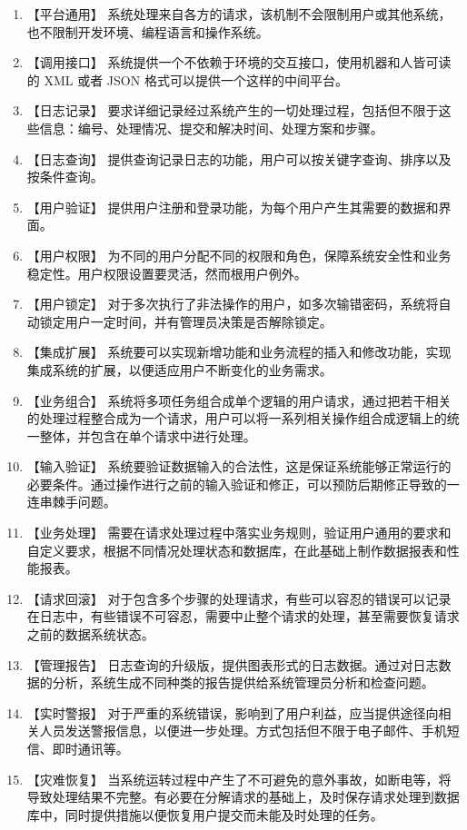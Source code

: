 \documentclass[cs4size,a4paper,nofonts]{ctexart}
\begin{document}
\begin{enumerate}
\item 【平台通用】
系统处理来自各方的请求，该机制不会限制用户或其他系统，也不限制开发环境、编程语言和操作系统。
\item 【调用接口】
系统提供一个不依赖于环境的交互接口，使用机器和人皆可读的 XML 或者 JSON 格式可以提供一个这样的中间平台。
\item 【日志记录】
要求详细记录经过系统产生的一切处理过程，包括但不限于这些信息：编号、处理情况、提交和解决时间、处理方案和步骤。
\item 【日志查询】
提供查询记录日志的功能，用户可以按关键字查询、排序以及按条件查询。
\item 【用户验证】
提供用户注册和登录功能，为每个用户产生其需要的数据和界面。
\item 【用户权限】
为不同的用户分配不同的权限和角色，保障系统安全性和业务稳定性。用户权限设置要灵活，然而根用户例外。
\item 【用户锁定】
对于多次执行了非法操作的用户，如多次输错密码，系统将自动锁定用户一定时间，并有管理员决策是否解除锁定。
\item 【集成扩展】
系统要可以实现新增功能和业务流程的插入和修改功能，实现集成系统的扩展，以便适应用户不断变化的业务需求。
\item 【业务组合】
系统将多项任务组合成单个逻辑的用户请求，通过把若干相关的处理过程整合成为一个请求，用户可以将一系列相关操作组合成逻辑上的统一整体，并包含在单个请求中进行处理。
\item 【输入验证】
系统要验证数据输入的合法性，这是保证系统能够正常运行的必要条件。通过操作进行之前的输入验证和修正，可以预防后期修正导致的一连串棘手问题。
\item 【业务处理】
需要在请求处理过程中落实业务规则，验证用户通用的要求和自定义要求，根据不同情况处理状态和数据库，在此基础上制作数据报表和性能报表。
\item 【请求回滚】
对于包含多个步骤的处理请求，有些可以容忍的错误可以记录在日志中，有些错误不可容忍，需要中止整个请求的处理，甚至需要恢复请求之前的数据系统状态。
\item 【管理报告】
日志查询的升级版，提供图表形式的日志数据。通过对日志数据的分析，系统生成不同种类的报告提供给系统管理员分析和检查问题。
\item 【实时警报】
对于严重的系统错误，影响到了用户利益，应当提供途径向相关人员发送警报信息，以便进一步处理。方式包括但不限于电子邮件、手机短信、即时通讯等。
\item 【灾难恢复】
当系统运转过程中产生了不可避免的意外事故，如断电等，将导致处理结果不完整。有必要在分解请求的基础上，及时保存请求处理到数据库中，同时提供措施以便恢复用户提交而未能及时处理的任务。

\end{enumerate}
\end{document}

